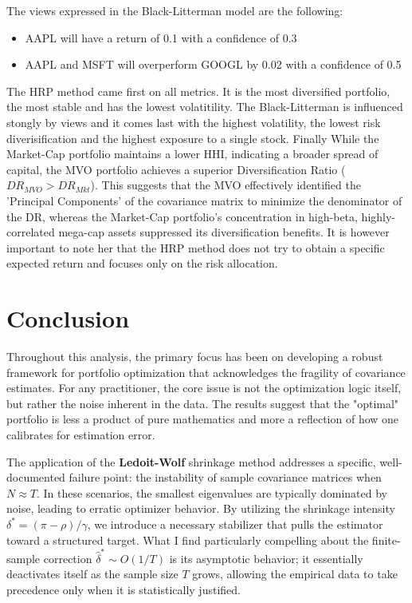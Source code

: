 \documentclass[11pt,a4paper]{article}
\begin{document}
The views expressed in the Black-Litterman model are the following:
\begin{itemize}
    \item AAPL will have a return of 0.1 with a confidence of 0.3
    \item AAPL and MSFT will overperform GOOGL by 0.02 with a confidence of 0.5
\end{itemize}

The HRP method came first on all metrics. It is the most diversified portfolio, the most stable and has the lowest volatitility.
The Black-Litterman is influenced stongly by views and it comes last with the highest volatility, the lowest risk diverisification and the highest exposure to a single stock.
Finally While the Market-Cap portfolio maintains a lower HHI, indicating a broader spread of capital, the MVO portfolio achieves a superior Diversification Ratio
($DR_{MVO} > DR_{Mkt}$). This suggests that the MVO effectively identified the 'Principal Components' of the covariance matrix to minimize
 the denominator of the DR, whereas the Market-Cap portfolio's concentration in high-beta, highly-correlated mega-cap assets suppressed 
 its diversification benefits.
 It is however important to note her that the HRP method does not try to obtain a specific expected return and focuses only on
 the risk allocation.


\section{Conclusion}

Throughout this analysis, the primary focus has been on developing a robust framework for portfolio optimization that acknowledges the fragility of covariance estimates. For any practitioner, the core issue is not the optimization logic itself, but rather the noise inherent in the data. The results suggest that the "optimal" portfolio is less a product of pure mathematics and more a reflection of how one calibrates for estimation error.

The application of the \textbf{Ledoit-Wolf} shrinkage method addresses a specific, well-documented failure point: the instability of sample covariance matrices when $N \approx T$. In these scenarios, the smallest eigenvalues are typically dominated by noise, leading to erratic optimizer behavior. By utilizing the shrinkage intensity $\delta^* = (\pi - \rho)/\gamma$, we introduce a necessary stabilizer that pulls the estimator toward a structured target. What I find particularly compelling about the finite-sample correction $\hat{\delta}^* \sim O(1/T)$ is its asymptotic behavior; it essentially deactivates itself as the sample size $T$ grows, allowing the empirical data to take precedence only when it is statistically justified.
\end{document}
